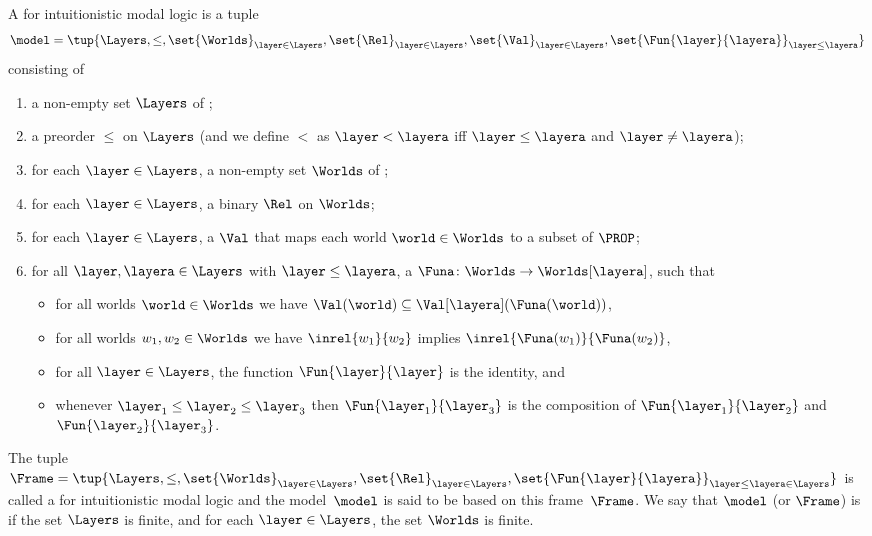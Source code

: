 \begin{definition}
  A  for intuitionistic modal logic is a tuple
$$
 \model= \tup{\Layers, \le, \set{\Worlds}_{\layer\in\Layers},
    \set{\Rel}_{\layer\in\Layers},
    \set{\Val}_{\layer\in\Layers},
    \set{\Fun{\layer}{\layera}}_{\layer\le\layera}
}
$$
consisting of
\begin{enumerate}
\item a non-empty set $\Layers$ of ; %

\item a preorder $\le$ on $\Layers$ (and we define $<$ as
  $\layer < \layera$ iff $\layer \le \layera$ and $\layer \neq \layera$);

\item  for each $\layer\in\Layers$, a non-empty set $\Worlds$ of ;
\item  for each $\layer\in\Layers$, a binary  $\Rel$ on $\Worlds$;
\item  for each $\layer\in\Layers$, a  $\Val$ that maps
  each world $\world\in\Worlds$ to a subset of $\PROP$;
\item for all $\layer,\layera\in\Layers$ with $\layer\le\layera$,  a
   $\Funa\colon\Worlds\to\Worlds[\layera]$, such that
  \begin{itemize}
  \item   for all worlds $\world\in\Worlds$ we have $\Val(\world)\subseteq\Val[\layera](\Funa(\world))$, 
  \item for all worlds $w_1,w_2\in\Worlds$ we have
  $\inrel {w_1}{w_2}$ implies $\inrel{\Funa(w_1)}{\Funa(w_2)}$,
  \item for all $\layer\in\Layers$, the function $\Fun{\layer}{\layer}$ is the identity, and 
  \item whenever $\layer_1 \le \layer_2 \le \layer_3$ then
  $\Fun{\layer_1}{\layer_3}$ is the composition of
  $\Fun{\layer_1}{\layer_2}$ and $\Fun{\layer_2}{\layer_3}$.
  \end{itemize}
\end{enumerate}
The tuple
$\Frame= \tup{\Layers, \le, \set{\Worlds}_{\layer\in\Layers},
    \set{\Rel}_{\layer\in\Layers},
    \set{\Fun{\layer}{\layera}}_{\layer\le\layera\in\Layers}
}$
is called a  for intuitionistic modal logic
and the model~$\model$ is said to be based on this frame~$\Frame$.  We
say that $\model$ (or $\Frame$) is  if the set $\Layers$
is finite, and for each $\layer\in\Layers$, the set $\Worlds$ is
finite.
\end{definition}


